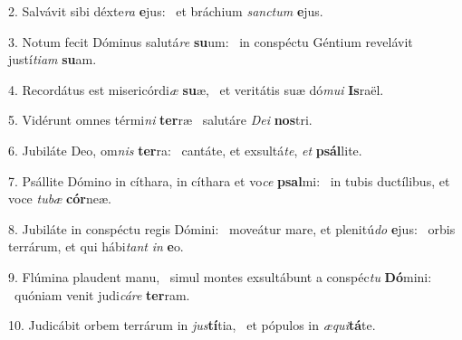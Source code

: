 2. Salvávit sibi déxte\textit{ra} \textbf{e}jus: \ast\  et bráchium \textit{sanc}\textit{tum} \textbf{e}jus.\

3. Notum fecit Dóminus salutá\textit{re} \textbf{su}um: \ast\  in conspéctu Géntium revelávit justí\textit{ti}\textit{am} \textbf{su}am.\

4. Recordátus est misericórdi\textit{æ} \textbf{su}æ, \ast\  et veritátis suæ dó\textit{mu}\textit{i} \textbf{Is}raël.\

5. Vidérunt omnes térmi\textit{ni} \textbf{ter}ræ \ast\  salutáre \textit{De}\textit{i} \textbf{nos}tri.\

6. Jubiláte Deo, om\textit{nis} \textbf{ter}ra: \ast\  cantáte, et exsultá\textit{te}, \textit{et} \textbf{psál}lite.\

7. Psállite Dómino in cíthara, in cíthara et vo\textit{ce} \textbf{psal}mi: \ast\  in tubis ductílibus, et voce \textit{tu}\textit{bæ} \textbf{cór}neæ.\

8. Jubiláte in conspéctu regis Dómini: \dag\  moveátur mare, et plenitú\textit{do} \textbf{e}jus: \ast\  orbis terrárum, et qui hábi\textit{tant} \textit{in} \textbf{e}o.\

9. Flúmina plaudent manu, \dag\  simul montes exsultábunt a conspéc\textit{tu} \textbf{Dó}mini: \ast\  quóniam venit judi\textit{cá}\textit{re} \textbf{ter}ram.\

10. Judicábit orbem terrárum in \textit{jus}\textbf{tí}tia, \ast\  et pópulos in \textit{æ}\textit{qui}\textbf{tá}te.\

